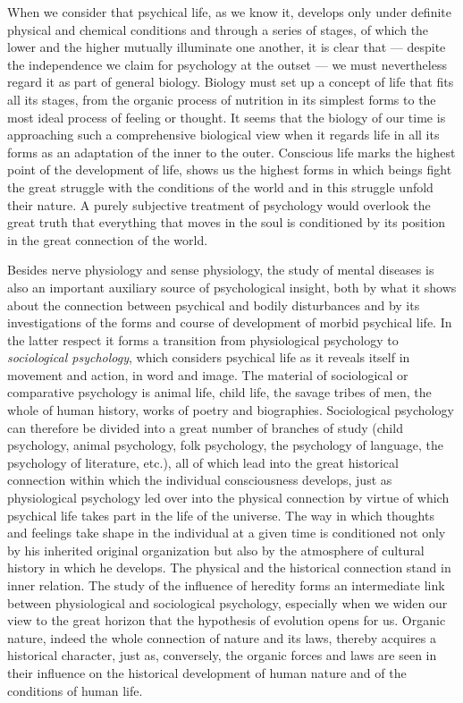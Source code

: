 \documentclass[12pt,a4paper]{book}
\newcommand{\opage}[1]{\marginnote{\footnotesize\textit{[#1]}}}
\begin{document}
When we consider that psychical life, as we know it, develops only under
definite physical and chemical conditions and through a series of stages,
of which the lower and the higher mutually illuminate one another, it is
clear that --- despite the independence we claim for psychology at the
outset --- we must nevertheless regard it as part of general biology.
Biology must set up a concept of life that fits all its stages, from the
organic process of nutrition in its simplest forms to the most ideal
process of feeling or thought. It seems that the biology of our time is
approaching such a comprehensive biological view when it regards life in
all its forms as an adaptation of the inner to the outer. Conscious life
marks the highest point of the development of life, shows us the highest
forms in which beings fight the great struggle with the conditions of the
world and in this struggle unfold their nature. A purely subjective
treatment of psychology would overlook the great truth that everything
that moves in the soul is conditioned by its position in the great
connection of the world.

Besides nerve physiology and sense physiology, the study of mental
diseases is also an important auxiliary source of psychological insight,
both by what it shows about the connection between psychical and bodily
disturbances and by its investigations of the forms and course of
development of morbid psychical life. In the latter respect it forms a
transition from physiological psychology to \emph{sociological
psychology}, which considers psychical life as it reveals itself in
movement and action, in word and image. The material of sociological or
comparative psychology is animal life, child life, the savage tribes of
men, the whole
\opage{32}of human history, works of poetry and biographies.
Sociological psychology can therefore be divided into a great number of
branches of study (child psychology, animal psychology, folk psychology,
the psychology of language, the psychology of literature, etc.), all of
which lead into the great historical connection within which the
individual consciousness develops, just as physiological psychology led
over into the physical connection by virtue of which psychical life
takes part in the life of the universe. The way in which thoughts and
feelings take shape in the individual at a given time is conditioned not
only by his inherited original organization but also by the atmosphere
of cultural history in which he develops. The physical and the historical
connection stand in inner relation. The study of the influence of
heredity forms an intermediate link between physiological and
sociological psychology, especially when we widen our view to the great
horizon that the hypothesis of evolution opens for us. Organic nature,
indeed the whole connection of nature and its laws, thereby acquires a
historical character, just as, conversely, the organic forces and laws
are seen in their influence on the historical development of human
nature and of the conditions of human life.
\end{document}
